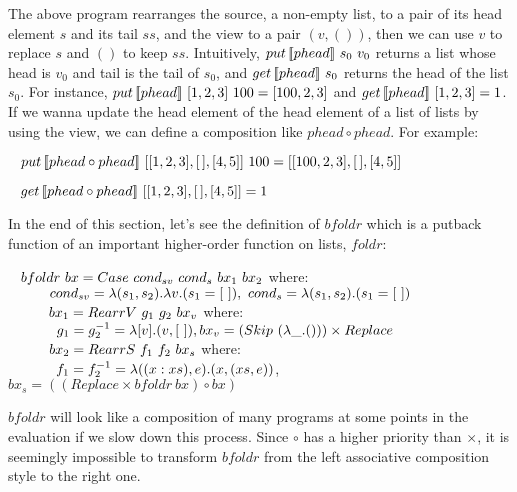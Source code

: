 The above program rearranges the source, a non-empty list, to a pair of its head element $s$ and its tail $ss$, and the view to a pair $(v, ())$, then we can use $v$ to replace $s$ and $()$ to keep $ss$. Intuitively, $put \, [\![phead]\!] \ s_0 \ v_0$ returns a list whose head is $v_0$ and tail is the tail of $s_0$, and $get \, [\![phead]\!] \ s_0$ returns the head of the list $s_0$. For instance, $put \, [\![phead]\!] \ [1,2,3] \ 100 = [100,2,3]$ and $get \, [\![phead]\!] \ [1,2,3] = 1$. If we wanna update the head element of the head element of a list of lists by using the view, we can define a composition like $phead \circ phead$. For example:

$\hspace*{3mm} put \, [\![phead \circ phead]\!] \ [[1,2,3],[\,],[4,5]] \ 100 = [[100,2,3],[\,],[4,5]]$

$\hspace*{3mm} get \, [\![phead \circ phead]\!] \ [[1,2,3],[\,],[4,5]] = 1$

In the end of this section, let's see the definition of $bfoldr$ which is a putback function of an important higher-order function on lists, $foldr$:

$\tab bfoldr \ bx = Case \ cond_{sv} \ cond_s \ bx_1 \ bx_2$ where:\\
$\tabs{3} \ cond_{sv} = \lambda (s_1,s_2).\lambda v.(s_1 = [\ ]), \ cond_s = \lambda (s_1,s_2).(s_1 = [\ ])$\\
$\tabs{3} \ bx_1 = RearrV \ g_1 \ g_2 \ bx_v$ where: \\
    $\tabs{4} g_1 = g_2^{-1} = \lambda [v].(v,[\ ]), bx_v = (Skip \ (\lambda \_.())) \times Replace$\\
$\tabs{3} \ bx_2 = RearrS \ f_1 \ f_2 \ bx_s$ where:\\
    $\tabs{4} f_1 = f_2^{-1} = \lambda ((x:xs),e).(x,(xs,e))$, 
    $bx_s = ((Replace \times bfoldr \ bx) \circ bx)$

\noindent $bfoldr$ will look like a composition of many programs at some points in the evaluation if we slow down this process. Since $\circ$ has a higher priority than $\times$, it is seemingly impossible to transform $bfoldr$ from the left associative composition style to the right one. 
